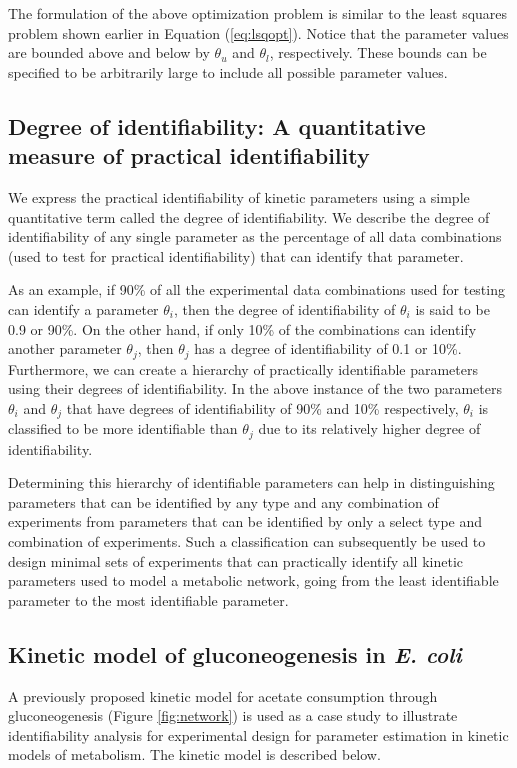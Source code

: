 \documentclass[10pt]{article}
\begin{document}
	The formulation of the above optimization problem is similar to the least squares problem shown earlier in Equation (\ref{eq:lsqopt}). Notice that the parameter values are bounded above and below by $\theta_u$ and $\theta_l$, respectively. These bounds can be specified to be arbitrarily large to include all possible parameter values.
	
	\subsection{Degree of identifiability: A quantitative measure of practical identifiability}\label{sec:degree_of_identifiability}
	We express the practical identifiability of kinetic parameters using a simple quantitative term called the degree of identifiability. We describe the degree of identifiability of any single parameter as the percentage of all data combinations (used to test for practical identifiability) that can identify that parameter. 
	
	As an example, if 90\% of all the experimental data combinations used for testing can identify a parameter $\theta_i$, then the degree of identifiability of $\theta_i$ is said to be 0.9 or 90\%. On the other hand, if only 10\% of the combinations can identify another parameter $\theta_j$, then $\theta_j$ has a degree of identifiability of 0.1 or 10\%. Furthermore, we can create a hierarchy of practically identifiable parameters using their degrees of identifiability. In the above instance of the two parameters $\theta_i$ and $\theta_j$ that have degrees of identifiability of 90\% and 10\% respectively, $\theta_i$ is classified to be more identifiable than $\theta_j$ due to its relatively higher degree of identifiability. 
	
	Determining this hierarchy of identifiable parameters can help in distinguishing parameters that can be identified by any type and any combination of experiments from parameters that can be identified by only a select type and combination of experiments. Such a classification can subsequently be used to design minimal sets of experiments that can practically identify all kinetic parameters used to model a metabolic network, going from the least identifiable parameter to the most identifiable parameter.  	
	
	\subsection{Kinetic model of gluconeogenesis in \textit{E. coli}}\label{sec:small-model}
	A previously proposed kinetic model \parencite{Kotte2014, Srinivasan2017} for acetate consumption through gluconeogenesis (Figure \ref{fig:network}) is used as a case study to illustrate identifiability analysis for experimental design for parameter estimation in kinetic models of metabolism. The kinetic model is described below.
	
\end{document}
